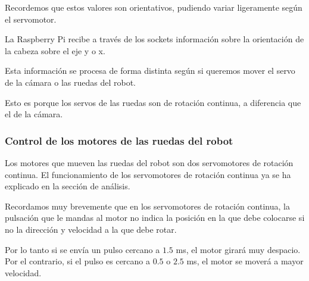 \documentclass[twoside, 11pt]{epstfg}
\begin{document}
Recordemos que estos valores son orientativos, pudiendo variar ligeramente según el servomotor.

%
%
%
%
%
%
%
%



La Raspberry Pi recibe a través de los sockets información sobre la orientación de la cabeza sobre el eje y o x.


Esta información se procesa de forma distinta según si queremos mover el servo de la cámara o las ruedas del robot.

Esto es porque los servos de las ruedas son de rotación continua, a diferencia que el de la cámara.

\subsubsection{\textbf{Control de los motores de las ruedas del robot}}

Los motores que mueven las ruedas del robot son dos servomotores de rotación continua. El funcionamiento de los servomotores de rotación continua ya se ha explicado en la sección de análisis.

Recordamos muy brevemente que en los servomotores de rotación continua, la pulsación que le mandas al motor no indica la posición en la que debe colocarse si no la dirección y velocidad a la que debe rotar.

Por lo tanto si se envía un pulso cercano a $1.5$ ms, el motor girará muy despacio. Por el contrario, si el pulso es cercano a $0.5$ o $2.5$ ms, el motor se moverá a mayor velocidad.
\end{document}
